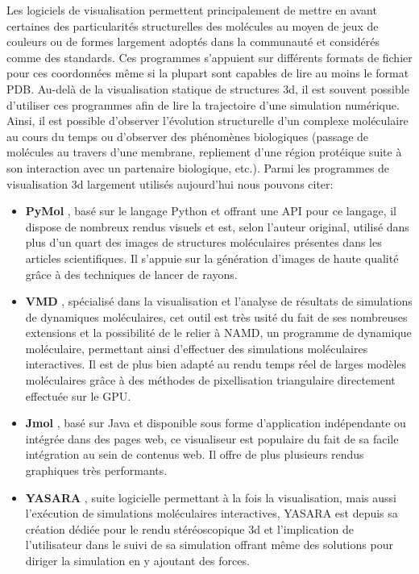 Les logiciels de visualisation permettent principalement de mettre en avant certaines des particularités structurelles des molécules au moyen de jeux de couleurs ou de formes largement adoptés dans la communauté et considérés comme des standards. Ces programmes s'appuient sur différents formats de fichier pour ces coordonnées même si la plupart sont capables de lire au moins le format PDB. Au-delà de la visualisation statique de structures 3d, il est souvent possible d'utiliser ces programmes afin de lire la trajectoire d'une simulation numérique. Ainsi, il est possible d'observer l'évolution structurelle d'un complexe moléculaire au cours du temps ou d'observer des phénomènes biologiques (passage de molécules au travers d'une membrane, repliement d'une région protéique suite à son interaction avec un partenaire biologique, etc.). Parmi les programmes de visualisation 3d largement utilisés aujourd'hui nous pouvons citer: 
\begin{itemize}
  \item \textbf{PyMol} \cite{delano_pymol_2002}, basé sur le langage Python et offrant une API pour ce langage, il dispose de nombreux rendus visuels et est, selon l'auteur original, utilisé dans plus d'un quart des images de structures moléculaires présentes dans les articles scientifiques. Il s'appuie sur la génération d'images de haute qualité grâce à des techniques de lancer de rayons.
  \item \textbf{VMD} \cite{humphrey_vmd:_1996}, spécialisé dans la visualisation et l'analyse de résultats de simulations de dynamiques moléculaires, cet outil est très usité du fait de ses nombreuses extensions et la possibilité de le relier à NAMD, un programme de dynamique moléculaire, permettant ainsi d'effectuer des simulations moléculaires interactives. Il est de plus bien adapté au rendu temps réel de larges modèles moléculaires grâce à des méthodes de pixellisation triangulaire directement effectuée sur le GPU.
  \item \textbf{Jmol} \cite{herraez2006biomolecules}, basé sur Java et disponible sous forme d'application indépendante ou intégrée dans des pages web, ce visualiseur est populaire du fait de sa facile intégration au sein de contenus web. Il offre de plus plusieurs rendus graphiques très performants.
  \item \textbf{YASARA} \cite{krieger2014yasara}, suite logicielle permettant à la fois la visualisation, mais aussi l’exécution de simulations moléculaires interactives, YASARA est depuis sa création dédiée pour le rendu stéréoscopique 3d et l'implication de l'utilisateur dans le suivi de sa simulation offrant même des solutions pour diriger la simulation en y ajoutant des forces.
\end{itemize}

